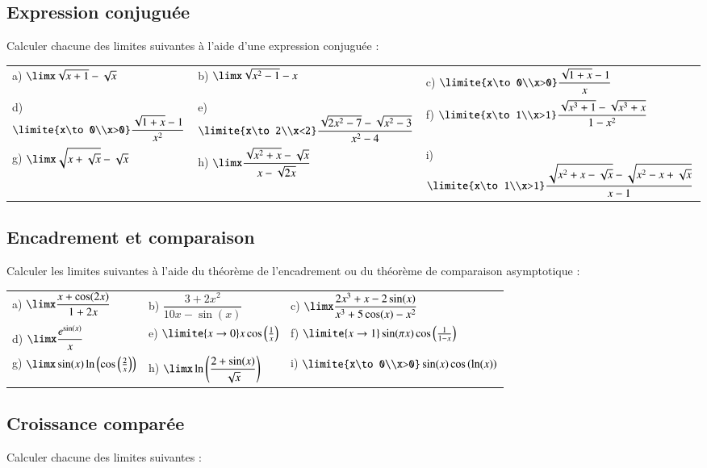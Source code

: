 \documentclass[oneside,12pt]{article}          %
\begin{document}
\subsection{Expression conjuguée}
Calculer chacune des limites suivantes à l'aide d'une expression conjuguée :

\begin{tabular}{p{} p{} p{}}
    a) $\limx \sqrt{x+1}-\sqrt{x}$ &
    b) $\limx \sqrt{x^2-1}-x$ &
    c) $\limite{x\to0\\x>0} \dfrac{\sqrt{1+x}-1}{x}$ \\
    d) $\limite{x\to0\\x>0} \dfrac{\sqrt{1+x}-1}{x^2}$& 
    e) $\limite{x\to2\\x<2} \dfrac{\sqrt{2x^2-7}-\sqrt{x^2-3}}{x^2-4}$ &
    f) $\limite{x\to1\\x>1} \dfrac{\sqrt{x^3+1}-\sqrt{x^3+x}}{1-x^2}$ \\
    g) $\limx \sqrt{x+\sqrt{x}}-\sqrt{x}$ &
    h) $\limx \dfrac{\sqrt{x^2+x}-\sqrt{x}}{x-\sqrt{2x}}$ &
    i) $\limite{x\to1\\x>1} \dfrac{\sqrt{x^2+x-\sqrt{x}}-\sqrt{x^2-x+\sqrt{x}}}{x-1}$
\end{tabular}


\subsection{Encadrement et comparaison}
Calculer les limites suivantes à l'aide du théorème de l'encadrement ou du théorème de comparaison asymptotique :

\renewcommand{\arraystretch}{2.2}
\begin{tabular}{p{} p{} p{}}
	a) $\limx\dfrac{x+\cos(2x)}{1+2x}$ & b) $\dfrac{3+2x^2}{10x-\sin(x)}$ & c) $\limx \dfrac{2x^3+x-2\sin(x)}{x^3+5\cos(x)-x^2}$\\
    d) $\limx \dfrac{e^{\sin(x)}}{x}$ & e) $\limite{x\to0}x\cos\left(\frac{1}{x}\right)$ & f) $\limite{x\to1} \sin(\pi x)\cos\left(\frac{1}{1-x}\right)$\\
    g) $\limx\sin(x)\ln\left(\cos\left(\frac{2}{x}\right)\right)$ & h) $\limx\ln\left(\dfrac{2+\sin(x)}{\sqrt{x}}\right)$ & i) $\limite{x\to0\\x>0}\sin(x)\cos\left(\ln(x)\right)$
\end{tabular}



\subsection{Croissance comparée}
Calculer chacune des limites suivantes :
\end{document}

